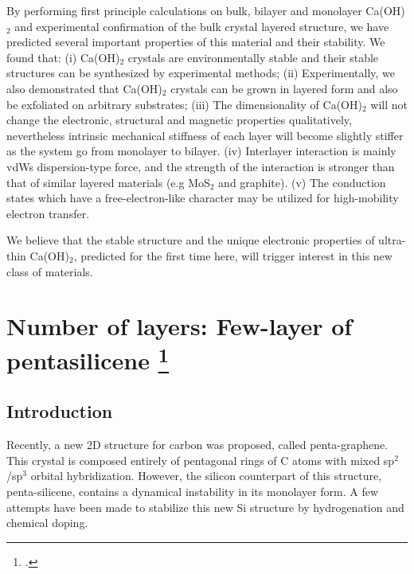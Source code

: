 By performing first principle calculations on bulk, bilayer and 
monolayer Ca(OH)$_2$ and experimental confirmation of the bulk crystal 
layered structure, we have predicted several important properties of this 
material and their stability. We found that: (i) Ca(OH)$_2$ crystals are 
environmentally stable and their stable structures can be synthesized by 
experimental methods; (ii) Experimentally, we also demonstrated that Ca(OH)$_2$ 
crystals can be grown in layered form and also be exfoliated on arbitrary 
substrates; (iii) The dimensionality of Ca(OH)$_2$ will not change the 
electronic, structural and magnetic properties qualitatively, nevertheless 
intrinsic mechanical stiffness of each layer will become slightly stiffer as 
the system go from monolayer to bilayer. (iv) Interlayer interaction is mainly 
vdWs dispersion-type force, and
the strength of the interaction is stronger than that of similar layered
materials (e.g MoS$_2$ and graphite). (v) The 
conduction states which have a free-electron-like character may be utilized for 
high-mobility electron transfer. 

We believe that the stable structure and the unique electronic properties of ultra-thin 
Ca(OH)$_2$, predicted for the first time here, will trigger interest in this 
new class of materials. 

\section[Number of layers: Few-layer of pentasilicene]{Number of layers: Few-layer of pentasilicene \footcite[This work is published in:][]{Aierken2016.pentasilicene} \label{pSi_layers}}

\subsection{Introduction\label{intro}}

Recently, a new 2D structure for carbon was proposed, called penta-graphene\cite{Zhang2015}. This crystal is composed entirely of pentagonal rings of C atoms with mixed sp$^2$/sp$^3$ orbital hybridization.  However, the silicon counterpart of this structure, penta-silicene, contains a dynamical instability in its monolayer form. A few attempts have been made to stabilize this new Si structure by hydrogenation\cite{Ding2015} and chemical doping\cite{Li2015b}. 

